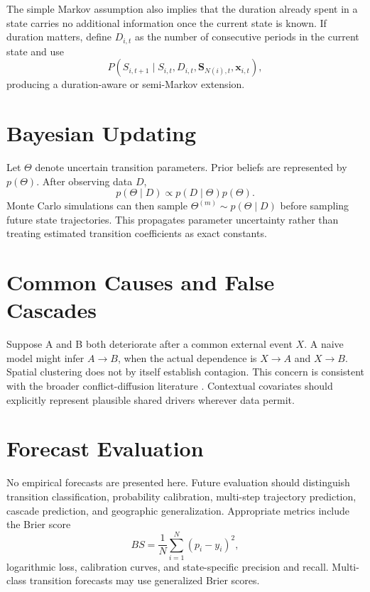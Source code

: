 \documentclass[11pt,letterpaper]{article}
\begin{document}
The simple Markov assumption also implies that the duration already spent in a state carries no additional information once the current state is known. If duration matters, define $D_{i,t}$ as the number of consecutive periods in the current state and use
\begin{equation}
P(S_{i,t+1}\mid S_{i,t},D_{i,t},\mathbf{S}_{N(i),t},\mathbf{x}_{i,t}),
\end{equation}
producing a duration-aware or semi-Markov extension.

\section{Bayesian Updating}
Let $\Theta$ denote uncertain transition parameters. Prior beliefs are represented by $p(\Theta)$. After observing data $D$,
\begin{equation}
p(\Theta\mid D)\propto p(D\mid\Theta)p(\Theta).
\end{equation}
Monte Carlo simulations can then sample $\Theta^{(m)}\sim p(\Theta\mid D)$ before sampling future state trajectories. This propagates parameter uncertainty rather than treating estimated transition coefficients as exact constants.

\section{Common Causes and False Cascades}
Suppose A and B both deteriorate after a common external event $X$. A naive model might infer $A\rightarrow B$, when the actual dependence is $X\rightarrow A$ and $X\rightarrow B$. Spatial clustering does not by itself establish contagion. This concern is consistent with the broader conflict-diffusion literature \citep{buhaug2008}. Contextual covariates should explicitly represent plausible shared drivers wherever data permit.

\section{Forecast Evaluation}
No empirical forecasts are presented here. Future evaluation should distinguish transition classification, probability calibration, multi-step trajectory prediction, cascade prediction, and geographic generalization. Appropriate metrics include the Brier score
\begin{equation}
BS=\frac1N\sum_{i=1}^{N}(p_i-y_i)^2,
\end{equation}
logarithmic loss, calibration curves, and state-specific precision and recall. Multi-class transition forecasts may use generalized Brier scores.
\end{document}
